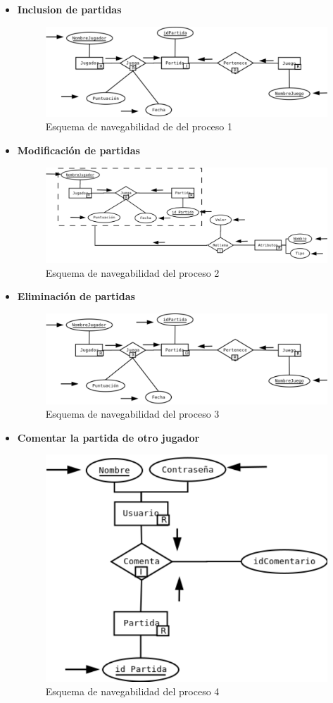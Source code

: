 
\begin{itemize}
  \item \textbf{Inclusion de partidas}
  \begin{figure}[H]
    \centering
    \includegraphics[width=0.5\linewidth]{../Diagramas/pdf/IncluirPartida.pdf}
    \caption{Esquema de navegabilidad de del proceso 1}
  \end{figure}

  \item \textbf{Modificación de partidas}
  \begin{figure}[H]
    \centering
    \includegraphics[width=0.5\linewidth]{../Diagramas/pdf/ModificarPartida.pdf}
    \caption{Esquema de navegabilidad del proceso 2}
  \end{figure}

  \item \textbf{Eliminación de partidas}
  \begin{figure}[H]
    \centering
    \includegraphics[width=0.5\linewidth]{../Diagramas/pdf/EliminarRegistro.pdf}
    \caption{Esquema de navegabilidad del proceso 3}
  \end{figure}

  \item \textbf{Comentar la partida de otro jugador}
  \begin{figure}[H]
    \centering
    \includegraphics[width=0.5\linewidth]{../Diagramas/pdf/ComentarPartida.pdf}
    \caption{Esquema de navegabilidad del proceso 4}
  \end{figure}


\end{itemize}
